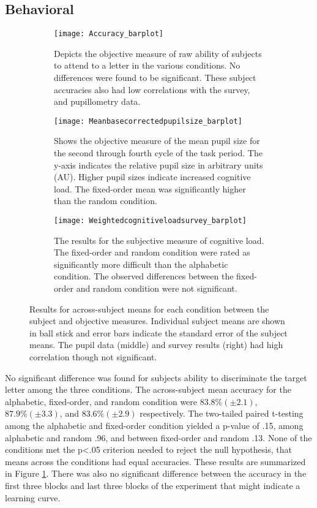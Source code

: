 \documentclass[10pt]{article}
\begin{document}
\subsection{Behavioral}

\begin{figure}[t]
    \centering
    \begin{subfigure}[t]{.25\linewidth}
        \centering
      \texttt{[image: Accuracy\_barplot]}
      \caption{Depicts the objective measure of raw ability of
      subjects to attend to a letter in the various
  conditions.  No differences were found to be significant.
  These subject accuracies also had low correlations with the
  survey, and pupillometry data.}
      \label{accuracy}
    \end{subfigure}
    \qquad
    \begin{subfigure}[t]{.25\linewidth}
      \centering
      \texttt{[image: Meanbasecorrectedpupilsize\_barplot]}
      \caption{Shows the objective measure of the mean pupil size for the second
      through fourth cycle of the task period. The y-axis indicates the
      relative pupil size in arbitrary units (AU). Higher pupil
      sizes indicate increased cognitive load.  The fixed-order
      mean was significantly higher than the random condition.} 
      \label{psBarplot}
    \end{subfigure}
    \qquad
    \begin{subfigure}[t]{.25\linewidth}
      \centering
      \texttt{[image: Weightedcognitiveloadsurvey\_barplot]}
      \caption{The results for the subjective measure of cognitive
  load.  The fixed-order and random condition were rated
  as significantly more difficult than the alphabetic
  condition. The observed differences between the fixed-order
  and random condition were not significant.}
      \label{cogLoad}
    \end{subfigure}
  \caption{Results for across-subject means for each condition
      between the subject and objective measures. Individual
  subject means are shown in ball stick and error bars
  indicate the standard error of the subject means.  The pupil
  data (middle) and survey results (right) had high
  correlation though not significant.}
\end{figure}

No significant difference was found for subjects ability to
discriminate the target letter among the three conditions.
The across-subject mean accuracy for the alphabetic, fixed-order, and random
condition were $83.8 \% (\pm2.1)$, $87.9 \% (\pm3.3)$,
and $83.6 \% (\pm 2.9)$ respectively.  The two-tailed paired t-testing among 
the alphabetic and fixed-order condition yielded a p-value of .15,
among alphabetic and random .96, and between fixed-order and
random .13.  None of the conditions met the p<.05 criterion needed
to reject the null hypothesis, that means across the conditions had
equal accuracies. These results are summarized in Figure \ref{accuracy}.
There was also no significant difference between the accuracy
in the first three blocks and last three blocks of the
experiment that might indicate a learning curve.
\end{document}
